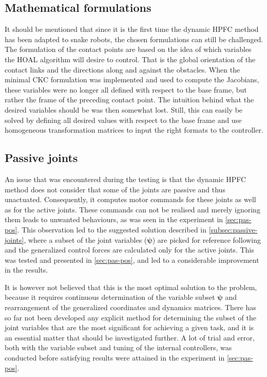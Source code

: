 \subsection{Mathematical formulations}

It should be mentioned that since it is the first time the dynamic HPFC method has been adapted to snake robots, the chosen formulations can still be challenged. The formulation of the contact points are based on the idea of which variables the HOAL algorithm will desire to control. That is the global orientation of the contact links and the directions along and against the obstacles. When the minimal CKC formulation was implemented and used to compute the Jacobians, these variables were no longer all defined with respect to the base frame, but rather the frame of the preceding contact point. The intuition behind what the desired variables should be was then somewhat lost. Still, this can easily be solved by defining all desired values with respect to the base frame and use homogeneous transformation matrices to input the right formats to the controller.

\subsection{Passive joints}\label{subsec:dis-passive-joints}

An issue that was encountered during the testing is that the dynamic HPFC method does not consider that some of the joints are passive and thus unactuated. Consequently, it computes motor commands for these joints as well as for the active joints. These commands can not be realised and merely ignoring them leads to unwanted behaviours, as was seen in the experiment in \ref{sec:pas-pos}. This observation led to the suggested solution described in \ref{subsec:passive-joints}, where a subset of the joint variables ($\boldsymbol{\psi}$) are picked for reference following and the generalized control forces are calculated only for the active joints. This was tested and presented in \ref{sec:pas-pos}, and led to a considerable improvement in the results.

It is however not believed that this is the most optimal solution to the problem, because it requires continuous determination of the variable subset $\boldsymbol{\psi}$ and rearrangement of the generalized coordinates and dynamics matrices. There has so far not been developed any explicit method for determining the subset of the joint variables that are the most significant for achieving a given task, and it is an essential matter that should be investigated further. A lot of trial and error, both with the variable subset and tuning of the internal controllers, was conducted before satisfying results were attained in the experiment in \ref{sec:pas-pos}.

